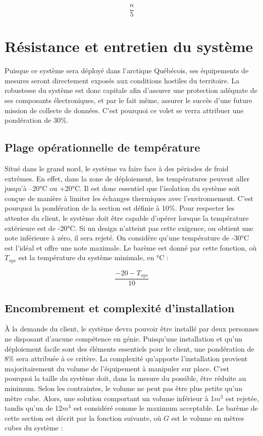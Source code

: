 \begin{equation}
    \frac{n}{5}
\end{equation}

\section{Résistance et entretien du système}
\label{Robustesse}
Puisque ce système sera déployé dans l'arctique Québécois, ses équipements de mesures seront directement exposés aux conditions hostiles du territoire. La robustesse du système est donc capitale afin d'assurer une protection adéquate de ses composants électroniques, et par le fait même, assurer le succès d'une future mission de collecte de données. C'est pourquoi ce volet se verra attribuer une pondération de 30\%.

\subsection{Plage opérationnelle de température}
\label{conditions_climatiques}
Situé dans le grand nord, le système va faire face à des périodes de froid extrêmes.
En effet, dans la zone de déploiement, les températures peuvent aller jusqu’à –20°C ou +20°C.
Il est donc essentiel que l’isolation du système soit conçue de manière à limiter les échanges thermiques avec l’environnement.
C’est pourquoi la pondération de la section est définie à 10\%.
Pour respecter les attentes du client, le système doit être capable d’opérer lorsque la température extérieure est de -20°C.
Si un design n’atteint pas cette exigence, ou obtient une note inférieure à zéro, il sera rejeté.
On considère qu'une température de -30°C est l'idéal et offre une note maximale.
Le barème est donné par cette fonction, où $T_{sys}$ est la température du système minimale, en °C :

\begin{equation}
    \frac{-20 -T_{sys}}{10}
\end{equation}

\subsection{Encombrement et complexité d'installation}
\label{installation_deploiement}
À la demande du client, le système devra pouvoir être installé par deux personnes ne disposant d'aucune compétence en génie.
Puisqu'une installation et qu'un déploiement facile sont des éléments essentiels pour le client, une pondération de 8\% sera attribuée à ce critère. 
La complexité qu'apporte l'installation provient majoritairement du volume de l'équipement à manipuler sur place.
C'est pourquoi la taille du système doit, dans la mesure du possible, être réduite au minimum.
Selon les contraintes, le volume ne peut pas être plus petite qu'un mètre cube.
Alors, une solution comportant un volume inférieur à 1$m^3$ est rejetée, tandis qu'un de 12$m^3$ est considéré comme le maximum acceptable.
Le barème de cette section est décrit par la fonction suivante, où $G$ est le volume en mètres cubes du système :

